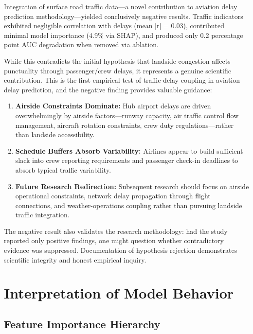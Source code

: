 \documentclass{report}
\begin{document}
Integration of surface road traffic data—a novel contribution to aviation delay prediction methodology—yielded conclusively negative results. Traffic indicators exhibited negligible correlation with delays (mean |r| = 0.03), contributed minimal model importance (4.9\% via SHAP), and produced only 0.2 percentage point AUC degradation when removed via ablation.

While this contradicts the initial hypothesis that landside congestion affects punctuality through passenger/crew delays, it represents a genuine scientific contribution. This is the first empirical test of traffic-delay coupling in aviation delay prediction, and the negative finding provides valuable guidance:

\begin{enumerate}
    \item \textbf{Airside Constraints Dominate:} Hub airport delays are driven overwhelmingly by airside factors—runway capacity, air traffic control flow management, aircraft rotation constraints, crew duty regulations—rather than landside accessibility.
    
    \item \textbf{Schedule Buffers Absorb Variability:} Airlines appear to build sufficient slack into crew reporting requirements and passenger check-in deadlines to absorb typical traffic variability.
    
    \item \textbf{Future Research Redirection:} Subsequent research should focus on airside operational constraints, network delay propagation through flight connections, and weather-operations coupling rather than pursuing landside traffic integration.
\end{enumerate}

The negative result also validates the research methodology: had the study reported only positive findings, one might question whether contradictory evidence was suppressed. Documentation of hypothesis rejection demonstrates scientific integrity and honest empirical inquiry.

\section{Interpretation of Model Behavior}
\label{sec:model_interpretation}

\subsection{Feature Importance Hierarchy}
\end{document}
